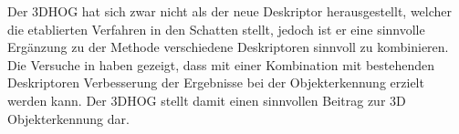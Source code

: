Der 3DHOG hat sich zwar nicht als der neue Deskriptor herausgestellt, welcher die etablierten Verfahren in den Schatten stellt, jedoch ist er eine sinnvolle Ergänzung zu der Methode verschiedene Deskriptoren sinnvoll zu kombinieren. Die Versuche in \cite{scherer2010histograms} haben gezeigt, dass mit einer Kombination mit bestehenden Deskriptoren Verbesserung der Ergebnisse bei der Objekterkennung erzielt werden kann. Der 3DHOG stellt damit einen sinnvollen Beitrag zur 3D Objekterkennung dar.
